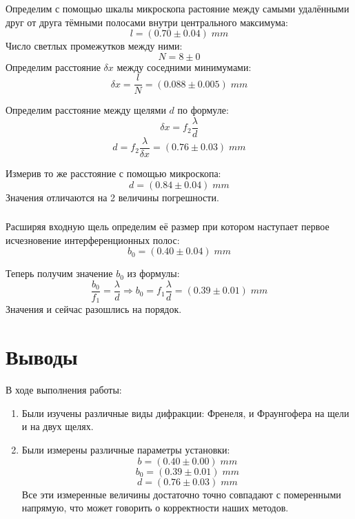 \documentclass{article}
\begin{document}
\subsubsection{}
Определим с помощью шкалы микроскопа растояние между самыми удалёнными друг от друга тёмными полосами
внутри центрального максимума:
\[ l = (0.70 \pm 0.04)\;mm \]
Число светлых промежутков между ними:
\[ N = 8\pm 0 \]
Определим расстояние \(\delta x\) между соседними минимумами:
\[ \delta x = \frac{l}{N} = (0.088\pm 0.005)\; mm \]

Определим расстояние между щелями \(d\) по формуле:
\[ \delta x = f_2\frac{\lambda}{d} \]
\[ d = f_2\frac{\lambda}{\delta x} = (0.76\pm 0.03)\;mm \]

Измерив то же расстояние с помощью микроскопа:
\[ d = (0.84\pm 0.04)\;mm \]
Значения отличаются на 2 величины погрешности.
\subsubsection{}
Расширяя входную щель определим её размер при котором наступает первое исчезновение интерференционных полос:
\[ b_0 = (0.40\pm 0.04)\;mm \]

Теперь получим значение \(b_0\) из формулы:
\[ \frac{b_0}{f_1} = \frac{\lambda}{d} \Rightarrow b_0 = f_1\frac{\lambda}{d} = (0.39 \pm 0.01)\;mm\]
Значения и сейчас разошлись на порядок.

\section{Выводы}
В ходе выполнения работы:
\begin{enumerate}
  \item Были изучены различные виды дифракции: Френеля, и Фраунгофера на щели и на двух щелях.
  \item Были измерены различные параметры установки:
  \[ b =  (0.40 \pm 0.00)\;mm \]
  \[ b_0 = (0.39\pm 0.01)\;mm \]
  \[ d = (0.76\pm 0.03)\;mm \]
  Все эти измеренные величины достаточно точно совпадают с померенными напрямую, что может говорить о корректности наших методов.
\end{enumerate}
\end{document}
